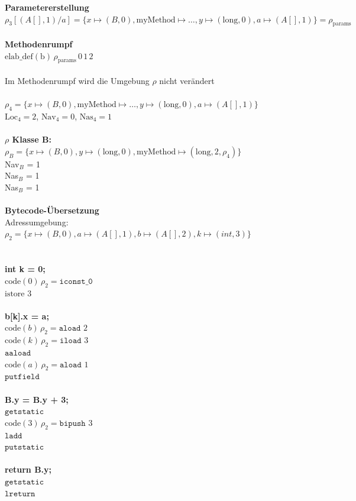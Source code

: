 \documentclass[11pt,a4paper]{article}
\begin{document}
\textbf{Parametererstellung}\\
$\rho_3[(A[], 1)/a] = \{x \mapsto (B, 0), \text{myMethod} \mapsto \ldots, y \mapsto (\text{long}, 0), a \mapsto (A[], 1)\} = \rho_{\text{params}}$\\\\
%
\textbf{Methodenrumpf }\\
$\text{elab\_def}(\text{b}) \, \rho_{\text{params}} \, 0 \, 1 \, 2$\\\\
Im Methodenrumpf wird die Umgebung $\rho$ nicht verändert\\\\
%
$\rho_4 = \{x \mapsto (B, 0), \text{myMethod} \mapsto \ldots, y \mapsto (\text{long}, 0), a \mapsto (A[], 1)\}$\\
$\text{Loc}_4 = 2$, $\text{Nav}_4 = 0$, $\text{Nas}_4 = 1$\\\\
%
\textbf{$\rho$ Klasse B:}\\
$\rho_B = \{x \mapsto (B, 0), y \mapsto (\text{long}, 0), \text{myMethod} \mapsto (\text{long}, 2, \rho_4)\}$\\
Nav$_B$ = 1\\
Nas$_B$ = 1\\
Nas$_B$ = 1\\\\
%
%
%
%
%
\textbf{Bytecode-Übersetzung}
\\
Adressumgebung: $\rho_2 = \{x \mapsto (B, 0), a \mapsto (A[], 1), b \mapsto (A[], 2), k \mapsto (int, 3)\}$\\\\
\\
\textbf{int k = 0;}\\
$\text{code}(0) \, \rho_2 = \texttt{iconst\_0}$\\
$\text{istore } 3$\\\\
%
\textbf{b[k].x = a;}\\
$\text{code}(b) \, \rho_2 = \texttt{aload } 2$\\
$\text{code}(k) \, \rho_2 = \texttt{iload } 3$\\
$\texttt{aaload}$\\
$\text{code}(a) \, \rho_2 = \texttt{aload } 1$\\
$\texttt{putfield}$\\\\
%
\textbf{B.y = B.y + 3;}\\
$\texttt{getstatic}$\\
$\text{code}(3) \, \rho_2 = \texttt{bipush } 3$\\
$\texttt{ladd}$\\
$\texttt{putstatic}$\\\\
%
\textbf{return B.y;}\\
$\texttt{getstatic}$\\
$\texttt{lreturn}$
\end{document}
